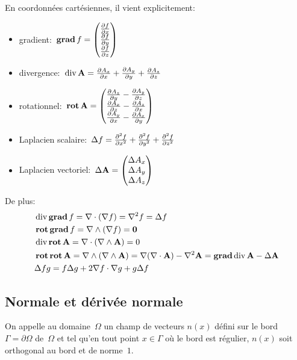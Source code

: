 \medskip
En coordonnées cartésiennes, il vient explicitement:
\begin{itemize}
  \item gradient:~$ \gradb f=
	\VV*{{\partial f \over \partial x}\\ {\partial f \over \partial y}\\ {\partial f \over \partial z}}$
  \item divergence:~$ \operatorname{div} \mathbf{A} =
	{\partial A_x \over \partial x} + {\partial A_y \over \partial y} + {\partial A_z \over \partial z}$
  \item rotationnel:~$ \rotb \mathbf{A} =
	\VV*{{\partial A_z \over \partial y} - {\partial A_y \over \partial z} \\
	{\partial A_x \over \partial z} - {\partial A_z \over \partial x} \\
	{\partial A_y \over \partial x} - {\partial A_x \over \partial y}}$
  \item Laplacien scalaire:~$\Delta f ={\partial^2 f \over \partial x^2} + {\partial^2 f \over \partial y^2} + {\partial^2 f \over \partial z^2}$
  \item Laplacien vectoriel:~$\Delta \mathbf{A} =
	\VV*{\Delta A_x \\ \Delta A_y \\ \Delta A_z}$
\end{itemize}

\medskip
De plus:
\begin{align}
&\dive \gradb f = \nabla \cdot (\nabla f) = \nabla^2 f = \Delta f\\
&\rotb\gradb f = \nabla \wedge ( \nabla f)
\colorred = \boldsymbol 0\\
&\dive\rotb \mathbf{A} = \nabla \cdot ( \nabla \wedge \mathbf{A} ) \colorred = 0\\
&\rotb\rotb\mathbf{A} = \nabla \wedge (\nabla \wedge \mathbf{A} ) =\nabla ( \nabla \cdot \mathbf{A} ) - \nabla^2 \mathbf{A} = \gradb\dive \mathbf{A} - \Delta \mathbf{A} \\
&\Delta f g = f \Delta g + 2 \nabla f \cdot \nabla g + g \Delta f
\end{align}

\medskip
\subsection{Normale et dérivée normale}

\begin{definition}[Normale]
On appelle  au domaine~$\Omega$ un champ de vecteurs $n(x)$ défini sur le bord~$\Gamma=\partial\Omega$ de~$\Omega$ et tel qu'en tout point $x\in\Gamma$ où le bord est régulier, $n(x)$ soit orthogonal au bord et de norme~$1$.
\end{definition}

